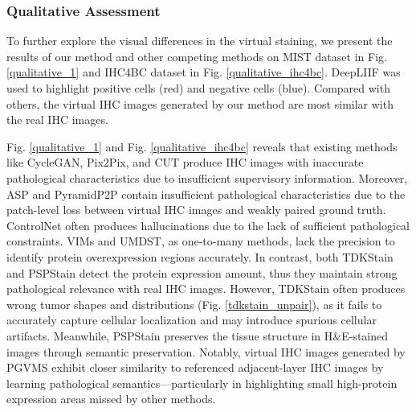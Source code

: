 \documentclass[journal,twoside,web]{ieeecolor}
\begin{document}
\subsubsection{Qualitative Assessment} To further explore the visual differences in the virtual staining, we present the results of our method and other competing methods on MIST dataset in Fig. \ref{qualitative_1} and IHC4BC dataset in Fig. \ref{qualitative_ihc4bc}. {DeepLIIF \cite{ghahremani2022deep} was used to highlight positive cells (red) and negative cells (blue).} Compared with others, the virtual IHC images generated by our method are most similar with the real IHC images.

Fig. \ref{qualitative_1} and Fig. \ref{qualitative_ihc4bc} reveals that existing methods like CycleGAN, Pix2Pix, and CUT produce IHC images with inaccurate pathological characteristics due to insufficient supervisory information. Moreover, ASP and PyramidP2P contain insufficient pathological characteristics due to the patch-level loss between virtual IHC images and weakly paired ground truth. {ControlNet often produces hallucinations due to the lack of sufficient pathological constraints. VIMs and UMDST, as one-to-many methods, lack the precision to identify protein overexpression regions accurately.}
In contrast, both TDKStain and PSPStain detect the protein expression amount, thus they maintain strong pathological relevance with real IHC images.  However, TDKStain often produces wrong tumor shapes and distributions (Fig. \ref{tdkstain_unpair}), as it fails to accurately capture cellular localization and may introduce spurious cellular artifacts. Meanwhile, PSPStain preserves the tissue structure in H\&E-stained images through semantic preservation. Notably, virtual IHC images generated by PGVMS exhibit closer similarity to referenced adjacent-layer IHC images by learning pathological semantics—particularly in highlighting small high-protein expression areas missed by other methods.
\end{document}
